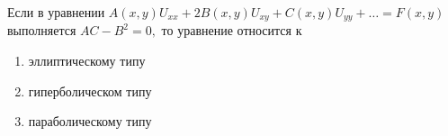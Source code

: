 Если в уравнении \(A\left(x,y\right)U_{xx}+2B\left(x,y\right)U_{xy}+C\left(x,y\right)U_{yy}+\dots =F\left(x,y\right)\) выполняется \(AC-B^2=0,\) то уравнение относится к

\begin{enumerate}[label=\arabic*)]
    \item эллиптическому типу
    \item гиперболическом типу
    \item параболическому типу
\end{enumerate}

